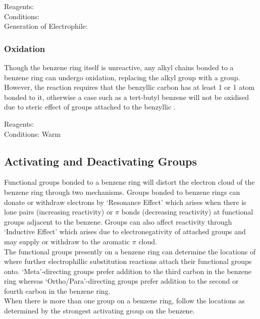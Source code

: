 \documentclass[../main]{subfiles}
\begin{document}
	Reagents:  \\
	Conditions:  \\

	Generation of Electrophile:  \\

	\subsubsection{Oxidation}

	Though the benzene ring itself is unreactive, any alkyl chains bonded to a benzene ring can undergo oxidation, replacing the alkyl group with a  group. However, the reaction requires that the benzyllic carbon has at least 1  or 1  atom bonded to it, otherwise a case such as a tert-butyl benzene will not be oxidised due to steric effect of  groups attached to the benzyllic .

	Reagents:  \\
	Conditions: Warm \\

	\subsection{Activating and Deactivating Groups}

	Functional groups bonded to a benzene ring will distort the electron cloud of the benzene ring through two mechanisms. 
	Groups bonded to benzene rings can donate or withdraw electrons by `Resonance Effect' which arises when there is lone pairs (increasing reactivity) or \(\pi\) bonds (decreasing reactivity) at functional groups adjacent to the benzene. Groups can also affect reactivity through `Inductive Effect' which arises due to electronegativity of attached groups and may supply or withdraw  to the aromatic \(\pi\)  cloud. \\

	The functional groups presently on a benzene ring can determine the locations of where further electrophillic substitution reactions attach their functional groups onto. `Meta'-directing groups prefer addition to the third carbon in the benzene ring whereas `Ortho/Para'-directing groups prefer addition to the second or fourth carbon in the benzene ring. \\

	When there is more than one group on a benzene ring, follow the locations as determined by the strongest activating group on the benzene.
	
\end{document}
